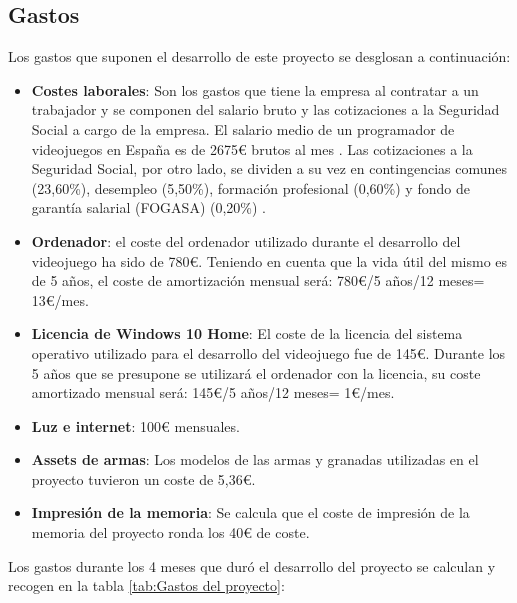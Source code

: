 \subsection{Gastos}
Los gastos que suponen el desarrollo de este proyecto se desglosan a continuación:
\begin{itemize}
    \item \textbf{Costes laborales}: Son los gastos que tiene la empresa al contratar a un trabajador y se componen del salario bruto y las cotizaciones a la Seguridad Social a cargo de la empresa. El salario medio de un programador de videojuegos en España es de 2675€ brutos al mes \cite{wiki:SueldoProgramador}. Las cotizaciones a la Seguridad Social, por otro lado, se dividen a su vez en contingencias comunes (23,60\%), desempleo (5,50\%), formación profesional (0,60\%) y fondo de garantía salarial (FOGASA) (0,20\%) \cite{wiki:SalarioBruto}.
    \item \textbf{Ordenador}: el coste del ordenador utilizado durante el desarrollo del videojuego ha sido de 780€. Teniendo en cuenta que la vida útil del mismo es de 5 años, el coste de amortización mensual será: 780€/5 años/12 meses= 13€/mes.
    \item \textbf{Licencia de Windows 10 Home}: El coste de la licencia del sistema operativo utilizado para el desarrollo del videojuego fue de 145€. Durante los 5 años que se presupone se utilizará el ordenador con la licencia, su coste amortizado mensual será: 145€/5 años/12 meses= 1€/mes.
    \item \textbf{Luz e internet}: 100€ mensuales.
    \item \textbf{Assets de armas}: Los modelos de las armas y granadas utilizadas en el proyecto tuvieron un coste de 5,36€.
    \item \textbf{Impresión de la memoria}: Se calcula que el coste de impresión de la memoria del proyecto ronda los 40€ de coste.
\end{itemize}
Los gastos durante los 4 meses que duró el desarrollo del proyecto se calculan y recogen en la tabla \ref{tab:Gastos del proyecto}:
